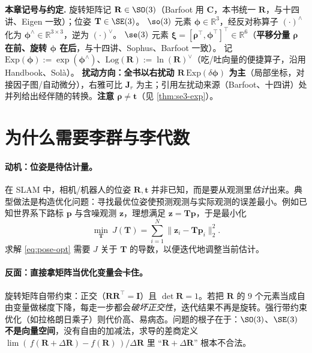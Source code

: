 \begin{note}
\textbf{本章记号与约定.}\;
旋转矩阵记 $\mathbf{R}\in\SO(3)$（Barfoot\cite{barfoot2024state} 用 $\mathbf{C}$，本书统一 $\mathbf{R}$，与十四讲\cite{gaoxiang2019slam14}、Eigen 一致）；位姿 $\mathbf{T}\in\SE(3)$。
$\so(3)$ 元素 $\boldsymbol{\phi}\in\mathbb{R}^3$，经反对称算子 $(\cdot)^\wedge$ 化为 $\boldsymbol{\phi}^\wedge\in\mathbb{R}^{3\times3}$，逆为 $(\cdot)^\vee$。
$\se(3)$ 元素 $\boldsymbol{\xi}=[\boldsymbol{\rho}^\top,\boldsymbol{\phi}^\top]^\top\in\mathbb{R}^6$（\textbf{平移分量 $\boldsymbol{\rho}$ 在前、旋转 $\boldsymbol{\phi}$ 在后}，与十四讲、Sophus、Barfoot 一致）。
记 $\mathrm{Exp}(\boldsymbol{\phi}):=\exp(\boldsymbol{\phi}^\wedge)$、$\mathrm{Log}(\mathbf{R}):=\ln(\mathbf{R})^\vee$（吃/吐向量的便捷算子，沿用 Handbook\cite{carlone2026handbook}、Solà\cite{sola2018micro}）。
\textbf{扰动方向：全书以右扰动 $\mathbf{R}\,\mathrm{Exp}(\delta\boldsymbol{\phi})$ 为主}（局部坐标，对接因子图/自动微分），右雅可比 $\mathbf{J}_r$ 为主；引用左扰动来源（Barfoot、十四讲）处并列给出经伴随的转换。\textbf{注意 $\boldsymbol{\rho}\neq\mathbf{t}$}（见 \cref{thm:se3-exp}）。
\end{note}

\section{为什么需要李群与李代数}
\label{sec:why-lie}

\paragraph{动机：位姿是待估计量。}
在 SLAM 中，相机/机器人的位姿 $\mathbf{R},\mathbf{t}$ 并非已知，而是要从观测里\emph{估计}出来。典型做法是构造优化问题：寻找最优位姿使预测观测与实际观测的误差最小\cite{gaoxiang2019slam14}。例如已知世界系下路标 $\mathbf{p}$ 与含噪观测 $\mathbf{z}$，理想满足 $\mathbf{z}=\mathbf{T}\mathbf{p}$，于是最小化
\begin{equation}
  \min_{\mathbf{T}}\ J(\mathbf{T})=\sum_{i=1}^{N}\big\|\mathbf{z}_i-\mathbf{T}\mathbf{p}_i\big\|_2^2.
  \label{eq:pose-opt}
\end{equation}
求解 \cref{eq:pose-opt} 需要 $J$ 关于 $\mathbf{T}$ 的导数，以便迭代地调整当前估计。

\paragraph{反面：直接拿矩阵当优化变量会卡住。}
旋转矩阵自带约束：正交（$\mathbf{R}\mathbf{R}^\top=\mathbf{I}$）且 $\det\mathbf{R}=1$。若把 $\mathbf{R}$ 的 $9$ 个元素当成自由变量做梯度下降，每走一步都会\emph{破坏正交性}，迭代结果不再是旋转。强行带约束优化（如拉格朗日乘子）则代价高、易病态。问题的根子在于：$\SO(3)$、$\SE(3)$ \textbf{不是向量空间}，没有自由的加减法，求导的差商定义 $\lim(\,f(\mathbf{R}+\Delta\mathbf{R})-f(\mathbf{R})\,)/\Delta\mathbf{R}$ 里 “$\mathbf{R}+\Delta\mathbf{R}$” 根本不合法。

